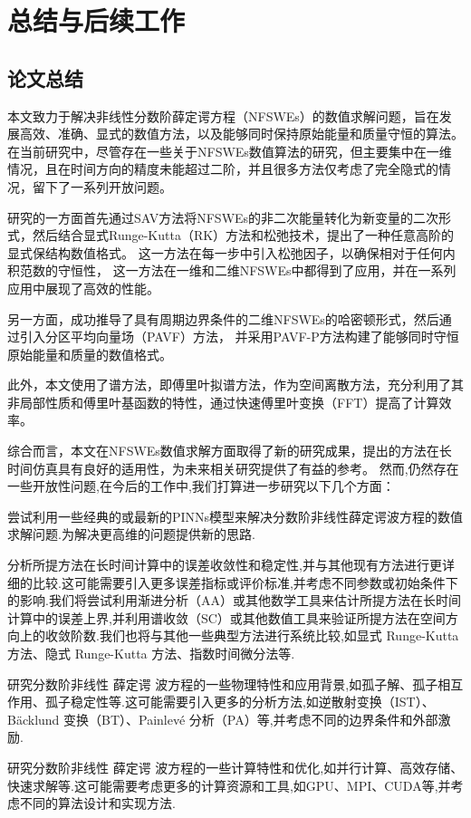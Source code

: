 
\chapter[总结与后续工作]{总结与后续工作}
\section{论文总结}

本文致力于解决非线性分数阶薛定谔方程（NFSWEs）的数值求解问题，旨在发展高效、准确、显式的数值方法，以及能够同时保持原始能量和质量守恒的算法。在当前研究中，尽管存在一些关于NFSWEs数值算法的研究，但主要集中在一维情况，且在时间方向的精度未能超过二阶，并且很多方法仅考虑了完全隐式的情况，留下了一系列开放问题。

研究的一方面首先通过SAV方法将NFSWEs的非二次能量转化为新变量的二次形式，然后结合显式Runge-Kutta（RK）方法和松弛技术，提出了一种任意高阶的显式保结构数值格式。
这一方法在每一步中引入松弛因子，以确保相对于任何内积范数的守恒性，
这一方法在一维和二维NFSWEs中都得到了应用，并在一系列应用中展现了高效的性能。

另一方面，成功推导了具有周期边界条件的二维NFSWEs的哈密顿形式，然后通过引入分区平均向量场（PAVF）方法，
并采用PAVF-P方法构建了能够同时守恒原始能量和质量的数值格式。

此外，本文使用了谱方法，即傅里叶拟谱方法，作为空间离散方法，充分利用了其非局部性质和傅里叶基函数的特性，通过快速傅里叶变换（FFT）提高了计算效率。

综合而言，本文在NFSWEs数值求解方面取得了新的研究成果，提出的方法在长时间仿真具有良好的适用性，为未来相关研究提供了有益的参考。
然而,仍然存在一些开放性问题,在今后的工作中,我们打算进一步研究以下几个方面：

尝试利用一些经典的或最新的PINNs模型来解决分数阶非线性薛定谔波方程的数值求解问题.为解决更高维的问题提供新的思路.

分析所提方法在长时间计算中的误差收敛性和稳定性,并与其他现有方法进行更详细的比较.这可能需要引入更多误差指标或评价标准,并考虑不同参数或初始条件下的影响.我们将尝试利用渐进分析（AA）或其他数学工具来估计所提方法在长时间计算中的误差上界,并利用谱收敛（SC）或其他数值工具来验证所提方法在空间方向上的收敛阶数.我们也将与其他一些典型方法进行系统比较,如显式 Runge-Kutta 方法、隐式 Runge-Kutta 方法、指数时间微分法等.

研究分数阶非线性 薛定谔 波方程的一些物理特性和应用背景,如孤子解、孤子相互作用、孤子稳定性等.这可能需要引入更多的分析方法,如逆散射变换（IST）、Bäcklund 变换（BT）、Painlevé 分析（PA）等,并考虑不同的边界条件和外部激励.

研究分数阶非线性 薛定谔 波方程的一些计算特性和优化,如并行计算、高效存储、快速求解等.这可能需要考虑更多的计算资源和工具,如GPU、MPI、CUDA等,并考虑不同的算法设计和实现方法.